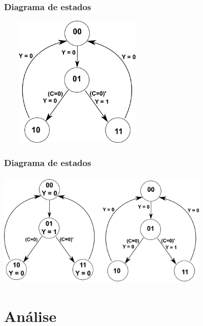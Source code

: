 \documentclass{beamer}
\begin{document}
\begin{frame}
  \frametitle{Diagrama de estados}
  \includegraphics[height = 2.5in, width = 3in]{images/mealyvsmoore_5.png}
\end{frame}

\begin{frame}
  \frametitle{Diagrama de estados}
  \includegraphics[height = 2.2in, width = 4in]{images/mealyvsmoore_6.png}
\end{frame}

\section{Análise}
\end{document}
